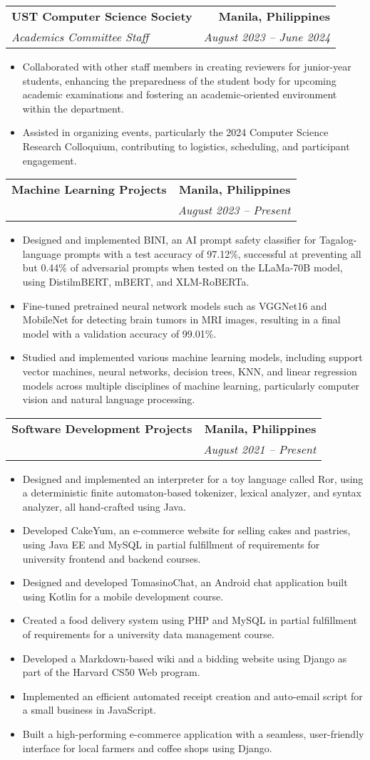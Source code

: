 \documentclass[letterpaper,11pt]{article}
\makeatletter
\newcommand{\resumeItem}[1]{
  \item\small{
    {#1 \vspace{-2pt}}
  }
}
\newcommand{\resumeSubheading}[4]{
  \vspace{-2pt}\item
    \begin{tabular*}{1.0\textwidth}[t]{l@{\extracolsep{\fill}}r}
      \textbf{#1} & \textbf{\small #2} \\
      \textit{\small#3} & \textit{\small #4} \\
    \end{tabular*}\vspace{-7pt}
}
\newcommand{\resumeItemListStart}{\begin{itemize}}
\newcommand{\resumeItemListEnd}{\end{itemize}\vspace{-5pt}}
\makeatother
\begin{document}
    \resumeSubheading
      {UST Computer Science Society}{Manila, Philippines}
      {Academics Committee Staff}{August 2023 -- June 2024}
      \resumeItemListStart
        \resumeItem{Collaborated with other staff members in creating reviewers for junior-year students, enhancing the preparedness of the student body for upcoming academic examinations and fostering an academic-oriented environment within the department.}
        \resumeItem{Assisted in organizing events, particularly the 2024 Computer Science Research Colloquium, contributing to logistics, scheduling, and participant engagement.}
      \resumeItemListEnd

    \resumeSubheading
      {Machine Learning Projects}{Manila, Philippines}
      {}{August 2023 -- Present}
      \resumeItemListStart
        \resumeItem{Designed and implemented BINI, an AI prompt safety classifier for Tagalog-language prompts with a test accuracy of 97.12\%, successful at preventing all but 0.44\% of adversarial prompts when tested on the LLaMa-70B model, using DistilmBERT, mBERT, and XLM-RoBERTa.}
        \resumeItem{Fine-tuned pretrained neural network models such as VGGNet16 and MobileNet for detecting brain tumors in MRI images, resulting in a final model with a validation accuracy of 99.01\%.}
        \resumeItem{Studied and implemented various machine learning models, including support vector machines, neural networks, decision trees, KNN, and linear regression models across multiple disciplines of machine learning, particularly computer vision and natural language processing.}
      \resumeItemListEnd

    \resumeSubheading
      {Software Development Projects}{Manila, Philippines}
      {}{August 2021 -- Present}
      \resumeItemListStart
        \resumeItem{Designed and implemented an interpreter for a toy language called Ror, using a deterministic finite automaton-based tokenizer, lexical analyzer, and syntax analyzer, all hand-crafted using Java.}
        \resumeItem{Developed CakeYum, an e-commerce website for selling cakes and pastries, using Java EE and MySQL in partial fulfillment of requirements for university frontend and backend courses.}
        \resumeItem{Designed and developed TomasinoChat, an Android chat application built using Kotlin for a mobile development course.}
        \resumeItem{Created a food delivery system using PHP and MySQL in partial fulfillment of requirements for a university data management course.}
        \resumeItem{Developed a Markdown-based wiki and a bidding website using Django as part of the Harvard CS50 Web program.}
        \resumeItem{Implemented an efficient automated receipt creation and auto-email script for a small business in JavaScript.}
        \resumeItem{Built a high-performing e-commerce application with a seamless, user-friendly interface for local farmers and coffee shops using Django.}
      \resumeItemListEnd
\end{document}
